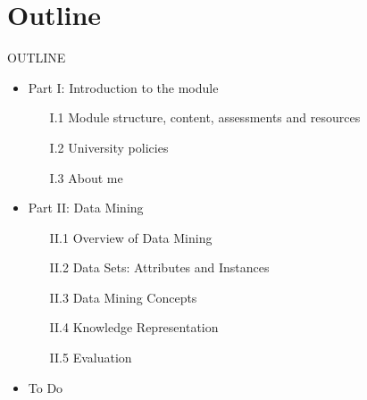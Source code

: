 \documentclass[handout]{beamer}
\begin{document}
\section*{Outline}
\begin{frame}{OUTLINE}
\begin{itemize}
\item Part I: Introduction to the module
	\begin{itemize}
	\item[I.1] Module structure, content, assessments and resources
	\item[I.2] University policies
	\item[I.3] About me
	\end{itemize}
\vspace*{0.3cm}
\item Part II: Data Mining 
	\begin{itemize}
	\item[II.1] Overview of Data Mining
	\item[II.2] Data Sets: Attributes and Instances
	\item[II.3] Data Mining Concepts
	\item[II.4] Knowledge Representation
	\item[II.5] Evaluation
	\end{itemize}
\vspace*{0.3cm}
\item To Do
\end{itemize}
\end{frame}


\end{document}
